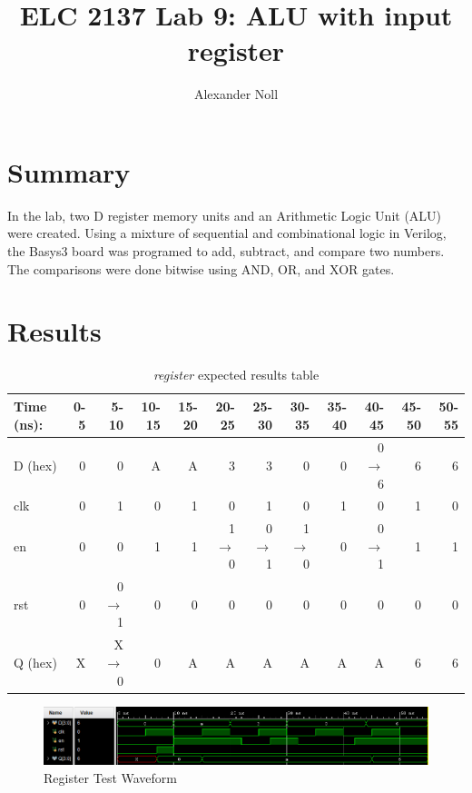 \documentclass[11pt]{article}
\begin{document}
\title{ELC 2137 Lab 9: ALU with input register}
\author{Alexander Noll}

\maketitle


\section*{Summary}

In the lab, two D register memory units and an Arithmetic Logic Unit (ALU)  were created. Using a mixture of sequential and combinational logic in Verilog, the Basys3 board was programed to add, subtract, and compare two numbers. The comparisons were done bitwise using AND, OR, and XOR gates.



\section*{Results}

\begin{table}[ht]\centering
	\caption{\textit{register} expected results table}
	\label{ALU:tbl:register_ERT}\medskip
	\begin{tabular}{l|rrrrrrrrrrr}
		Time (ns): & 0-5 & 5-10 & 10-15 & 15-20 & 20-25 & 25-30 & 30-35 & 35-40 & 40-45 & 45-50 & 50-55 \\
		\midrule
		D (hex) & 0 & 0 	  & A & A & 3 	    & 3 	  & 0 	    & 0 & 0$\to$6 & 6 & 6 \\
		clk     & 0 & 1 	  & 0 & 1 & 0 	    & 1 	  & 0 	    & 1 & 0 	  & 1 & 0 \\
		en  	& 0 & 0 	  & 1 & 1 & 1$\to$0 & 0$\to$1 & 1$\to$0 & 0 & 0$\to$1 & 1 & 1 \\
		rst 	& 0 & 0$\to$1 & 0 & 0 & 0 		& 0 	  & 0		& 0 & 0		  & 0 & 0 \\
		\midrule
		Q (hex) & X & X$\to$0 & 0 & A & A & A & A & A & A & 6 & 6\\
		\bottomrule
	\end{tabular}
\end{table}

\begin{figure}[ht]\centering
	\includegraphics[width=1.0\textwidth,trim=0 0mm 0 0,clip]{RegisterTest}
	\caption{Register Test Waveform}
\end{figure}
\end{document}
